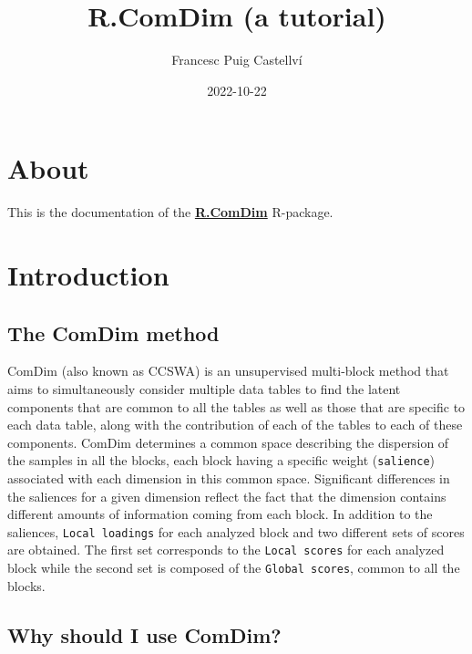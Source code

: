 \documentclass[
]{book}
\title{R.ComDim (a tutorial)}
\author{Francesc Puig Castellví}
\date{2022-10-22}
\begin{document}
\maketitle

{
\setcounter{tocdepth}{1}
\tableofcontents
}
\hypertarget{about}{%
\chapter{About}\label{about}}

This is the documentation of the
\href{https://github.com/f-puig/R.ComDim}{\textbf{R.ComDim}} R-package.

\hypertarget{introduction}{%
\chapter{Introduction}\label{introduction}}

\hypertarget{ComDim}{%
\section{The ComDim method}\label{ComDim}}

ComDim (also known as CCSWA) is an unsupervised multi-block method that aims to
simultaneously consider multiple data tables to find the latent components that
are common to all the tables as well as those that are specific to each data
table, along with the contribution of each of the tables to each of these
components. ComDim determines a common space describing the dispersion of the
samples in all the blocks, each block having a specific weight (\texttt{salience})
associated with each dimension in this common space. Significant differences
in the saliences for a given dimension reflect the fact that the dimension
contains different amounts of information coming from each block. In addition
to the saliences, \texttt{Local\ loadings} for each analyzed block and two different
sets of scores are obtained. The first set corresponds to the \texttt{Local\ scores} for
each analyzed block while the second set is composed of the \texttt{Global\ scores},
common to all the blocks.

\hypertarget{why}{%
\section{Why should I use ComDim?}\label{why}}
\end{document}
